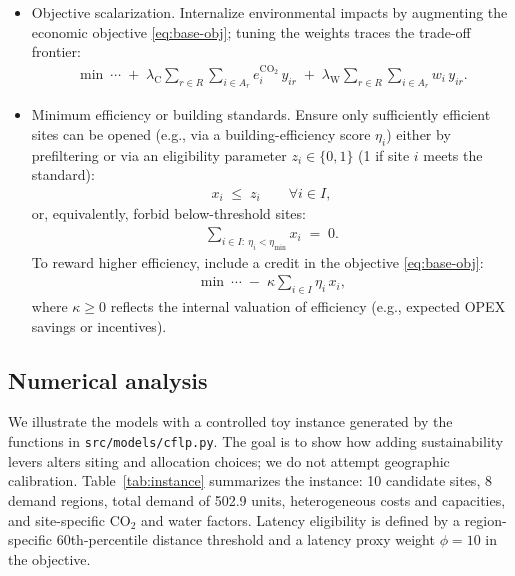 \documentclass[pdflatex,sn-mathphys-num]{sn-jnl}
\theoremstyle{thmstyleone}
\theoremstyle{thmstyletwo}
\theoremstyle{thmstylethree}
\begin{document}
\begin{itemize}
  
  \item {Objective scalarization.}
  Internalize environmental impacts by augmenting the economic objective \eqref{eq:base-obj}; tuning the weights traces the trade-off frontier:
  \begin{align}
    \min \ \cdots \;+\;
    \lambda_{\mathrm{C}} \sum_{r \in R}\sum_{i \in A_r} e_i^{\mathrm{CO_2}} \, y_{ir}
    \;+\;
    \lambda_{\mathrm{W}} \sum_{r \in R}\sum_{i \in A_r} w_i \, y_{ir}.
    \label{eq:scalarized}
  \end{align}
 

  \item {Minimum efficiency or building standards.}
  Ensure only sufficiently efficient sites can be opened (e.g., via a building-efficiency score \(\eta_i\)) either by prefiltering or via an eligibility parameter \(z_i\in\{0,1\}\) (1 if site \(i\) meets the standard):
  \begin{align}
    x_i \;\le\; z_i \qquad \forall i \in I,
    \label{eq:efficiency-eligibility}
  \end{align}
  or, equivalently, forbid below-threshold sites:
  \begin{align}
    \sum_{i \in I:\ \eta_i < \eta_{\min}} x_i \;=\; 0.
    \label{eq:efficiency-min}
  \end{align}
  To reward higher efficiency, include a credit in the objective \eqref{eq:base-obj}:
  \begin{align}
    \min \ \cdots \;-\; \kappa \sum_{i \in I} \eta_i \, x_i,
    \label{eq:efficiency-credit}
  \end{align}
  where \(\kappa \ge 0\) reflects the internal valuation of efficiency (e.g., expected OPEX savings or incentives).
 
\end{itemize}

\subsection{Numerical analysis}\label{sec:num}

We illustrate the models with a controlled toy instance generated by the functions in \texttt{src/models/cflp.py}. The goal is to show how adding sustainability levers alters siting and allocation choices; we do not attempt geographic calibration. Table~\ref{tab:instance} summarizes the instance: 10 candidate sites, 8 demand regions, total demand of 502.9 units, heterogeneous costs and capacities, and site-specific CO$_2$ and water factors. Latency eligibility is defined by a region-specific 60th-percentile distance threshold and a latency proxy weight $\phi=10$ in the objective.
\end{document}

